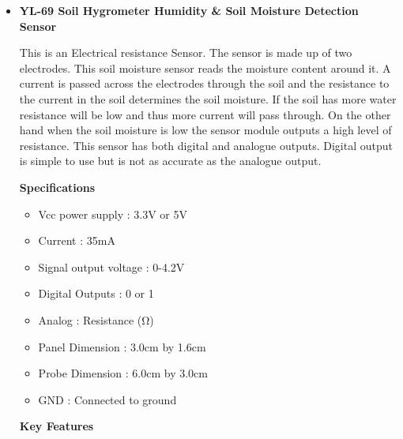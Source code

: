 \documentclass[16pt]{article}
\begin{document}
\begin{itemize}

\item{\textbf{YL-69 Soil Hygrometer Humidity \& Soil Moisture Detection Sensor}}


\vspace{0.3cm}
This is an Electrical resistance Sensor. The sensor is made up of two
electrodes. This soil moisture sensor reads the moisture content around
it. A current is passed across the electrodes through the soil and the
resistance to the current in the soil determines the soil moisture. If
the soil has more water resistance will be low and thus more current
will pass through. On the other hand when the soil moisture is low the
sensor module outputs a high level of resistance. This sensor has both
digital and analogue outputs. Digital output is simple to use but is not
as accurate as the analogue output.

\vspace{0.5cm}

{\Large{\textbf{Specifications}}}

\begin{itemize}

\item
  Vcc power supply : 3.3V or 5V
\item
  Current : 35mA
\item
  Signal output voltage : 0-4.2V
\item
  Digital Outputs : 0 or 1
\item
  Analog : Resistance (Ω)
\item
  Panel Dimension : 3.0cm by 1.6cm
\item
  Probe Dimension : 6.0cm by 3.0cm
\item
  GND : Connected to ground
\end{itemize}

\vspace{0.5cm}
{\Large{\textbf{Key Features}}}

\begin{itemize}


\end{itemize}
\end{itemize}
\end{document}
